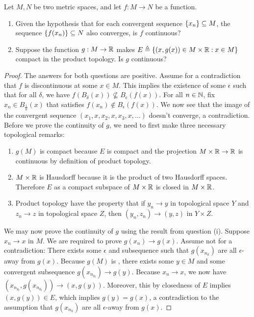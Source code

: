 \documentclass{report}
\begin{document}
\begin{question}{}{}
Let $M,N$ be two metric spaces, and let $f:M\rightarrow N$ be a function. 
 \begin{enumerate}[label=(\roman*)]
  \item Given the hypothesis that for each convergent sequence $\left\{ x_n \right\}\subseteq M$, the sequence $\left\{ f(x_n) \right\}\subseteq N$ also converges, is $f$ continuous? 
  \item Suppose the function $g:M\rightarrow \mathbb{R}$ makes $E\triangleq \left\{ (x,g(x))\in M\times \mathbb{R}:x\in M \right\}$ compact in the product topology. Is $g$ continuous? 
\end{enumerate}
\end{question}
\begin{proof}
The answers for both questions are positive. Assume for a contradiction that $f$ is discontinuous at some $x \in M$. This implies the existence of some $\epsilon $ such that for all $\delta$, we have $f(B_\delta(x))\not \subseteq B_\epsilon (f(x))$. For all $n\in\mathbb{N}$, fix $x_n \in B_{\frac{1}{n}}(x)$ that satisfies $f(x_n)\not\in B_\epsilon (f(x))$. We now see that the image of the convergent sequence $(x_1,x,x_2,x,x_3,x,\dots) $  doesn't converge, a contradiction.\\

Before we prove the continuity of $g$, we need to first make three necessary topological remarks: 
 \begin{enumerate}[label=(\alph*)]
  \item $g(M)$ is compact because $E$ is compact and the projection $M\times \mathbb{R}\rightarrow \mathbb{R}$ is continuous by definition of product topology.   
  \item $M\times \mathbb{R}$ is Hausdorff because it is the product of two Hausdorff spaces. Therefore $E$ as a compact subspace of $M\times \mathbb{R} $ is closed in $M\times \mathbb{R}$.  
  \item Product topology have the property that if $y_n \rightarrow y$ in topological space $Y$ and  $z_n \rightarrow z$ in topological space $Z$, then $(y_n,z_n)\rightarrow (y,z)$ in $Y\times Z$. 
\end{enumerate}
We may now prove the continuity of $g$ using the result from question (i). Suppose $x_n\rightarrow x$ in $M$. We are required to prove $g(x_n)\rightarrow g(x)$. Assume not for a contradiction: There exists some $\epsilon $ and subsequence such that $g(x_{n_k})$ are all $\epsilon$-away from $g(x)$.  Because $g(M)$ is , there exists some $y \in M$ and some convergent subsequence $g(x_{n_{k_l}})\rightarrow g(y)$. Because $x_n\rightarrow x$, we now have $(x_{n_{k_l}},g(x_{n_{k_l}}))\rightarrow (x,g(y))$. Moreover, this by closedness of $E$ implies  $(x,g(y))\in E$, which implies $g(y)=g(x)$, a contradiction to the assumption that $g(x_{n_k})$ are all $\epsilon $-away from $g(x)$.  




\end{proof}
\end{document}
